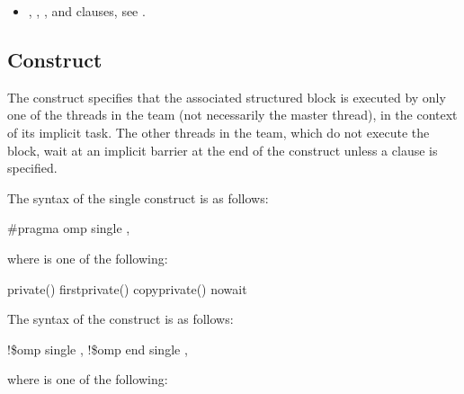 \crossreferences
\begin{itemize}
\item {}, , , and  clauses, see 
.
\end{itemize}










\subsection{ Construct}
\label{subsec:single Construct}
\summary
The  construct specifies that the associated structured block is executed by only 
one of the threads in the team (not necessarily the master thread), in the context of its 
implicit task. The other threads in the team, which do not execute the block, wait at an 
implicit barrier at the end of the  construct unless a  clause is specified.

\parbox{\linewidth}{%
\syntax
\ccppspecificstart}
The syntax of the single construct is as follows:

\begin{boxedcode}
\#pragma omp single \plc{[clause[ [},\plc{] clause] ... ] new-line}
\end{boxedcode}

\begin{samepage}
where  is one of the following:

\begin{indentedcodelist}
private()
firstprivate()
copyprivate()
nowait
\end{indentedcodelist}
\ccppspecificend
\end{samepage}

\fortranspecificstart
The syntax of the  construct is as follows:

\begin{boxedcode}
!\$omp single \plc{[clause[ [},\plc{] clause] ... ]}
!\$omp end single \plc{[end\_clause[ [},\plc{] end\_clause] ... ]}
\end{boxedcode}

where  is one of the following:

